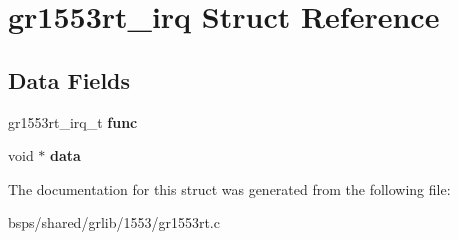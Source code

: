 \hypertarget{structgr1553rt__irq}{}\section{gr1553rt\+\_\+irq Struct Reference}
\label{structgr1553rt__irq}
\subsection*{Data Fields}
\begin{DoxyCompactItemize}
\item 
\mbox{\label{structgr1553rt__irq_af8e221710057e5e926e168848d3a0e2f}} 
gr1553rt\+\_\+irq\+\_\+t {\bfseries func}
\item 
\mbox{\label{structgr1553rt__irq_af4c65acb4b32eafecf1bfb2a64f04667}} 
void $\ast$ {\bfseries data}
\end{DoxyCompactItemize}


The documentation for this struct was generated from the following file\+:\begin{DoxyCompactItemize}
\item 
bsps/shared/grlib/1553/gr1553rt.\+c\end{DoxyCompactItemize}
